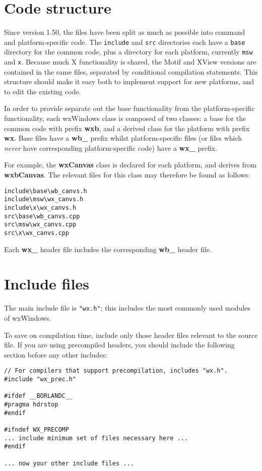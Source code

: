 \section{Code structure}

Since version 1.50, the files have been split as much as possible into
command and platform-specific code. The {\tt include} and {\tt src} directories
each have a {\tt base} directory for the common code, plus a directory for
each platform, currently {\tt msw} and {\tt x}. Because much X functionality
is shared, the Motif and XView versions are contained in the same files, separated
by conditional compilation statements. This structure should make it easy
both to implement support for new platforms, and to edit the existing code.

In order to provide separate out the base functionality from the
platform-specific functionality, each wxWindows class is composed of two
classes: a base for the common code with prefix {\bf wxb}, and a derived
class for the platform with prefix {\bf wx}. Base files have a {\bf
wb\_} prefix whilst platform-specific files (or files which {\it never}
have corresponding platform-specific code) have a {\bf wx\_} prefix.

For example, the {\bf wxCanvas} class is declared for each platform, and
derives from {\bf wxbCanvas}. The relevant files for this class may
therefore be found as follows:

\begin{verbatim}
include\base\wb_canvs.h
include\msw\wx_canvs.h
include\x\wx_canvs.h
src\base\wb_canvs.cpp
src\msw\wx_canvs.cpp
src\x\wx_canvs.cpp
\end{verbatim}

Each {\bf wx\_} header file includes the corresponding {\bf wb\_} header file.

\section{Include files}

The main include file is {\tt "wx.h"}; this includes the most commonly
used modules of wxWindows.

To save on compilation time, include only those header files relevant to the
source file. If you are using precompiled headers, you should include
the following section before any other includes:

\begin{verbatim}
// For compilers that support precompilation, includes "wx.h".
#include "wx_prec.h"

#ifdef __BORLANDC__
#pragma hdrstop
#endif

#ifndef WX_PRECOMP
... include minimum set of files necessary here ...
#endif

... now your other include files ...
\end{verbatim}

